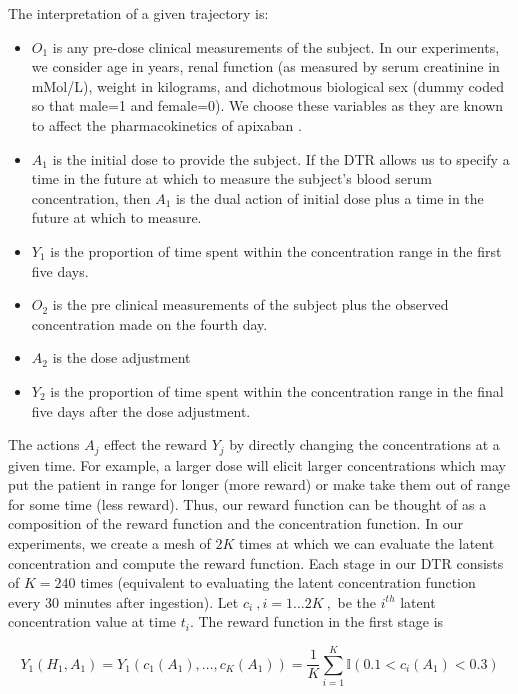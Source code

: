 \noindent The interpretation of a given trajectory is:
\begin{itemize}
	\item $ O_1 $ is any pre-dose clinical measurements of the subject.  In our experiments, we consider age in years, renal function (as measured by serum creatinine in mMol/L), weight in kilograms, and dichotmous biological sex (dummy coded so that male=1 and female=0).  We choose these variables as they are known to affect the pharmacokinetics of apixaban \cite{byon2019apixaban}.  
	\item $ A_1 $ is the initial dose to provide the subject.  If the DTR allows us to specify a time in the future at which to measure the subject’s blood serum concentration, then $A_1$ is the dual action of initial dose plus a time in the future at which to measure.
	\item $ Y_1 $ is the proportion of time spent within the concentration range in the first five days.
	\item $ O_2 $ is the pre clinical measurements of the subject plus the observed concentration made on the fourth day.
	\item $ A_2 $ is the dose adjustment
	\item $ Y_2 $ is the proportion of time spent within the concentration range in the final five days after the dose adjustment.
\end{itemize}

The actions $A_j$ effect the reward $Y_j$ by directly changing the concentrations at a given time.  For example, a larger dose will elicit larger concentrations which may put the patient in range for longer (more reward) or make take them out of range for some time (less reward).  Thus, our reward function can be thought of as a composition of the reward function and the concentration function.  In our experiments, we create a mesh of $2K$ times at which we can evaluate the latent concentration and compute the reward function.  Each stage in our DTR consists of $K=240$ times (equivalent to evaluating the latent concentration function every 30 minutes after ingestion).  Let $ c_i \>,  i=1...2K \>, $ be the $ i^{th}$ latent concentration value at time $ t_i $.  The reward function in the first stage is

\begin{equation}
Y_1(H_1, A_1) = Y_1(c_1(A_1), \dots, c_K(A_1)) = \dfrac{1}{K}\sum_{i=1}^K \mathbb{I}(0.1 < c_i(A_1) < 0.3)
\end{equation}



